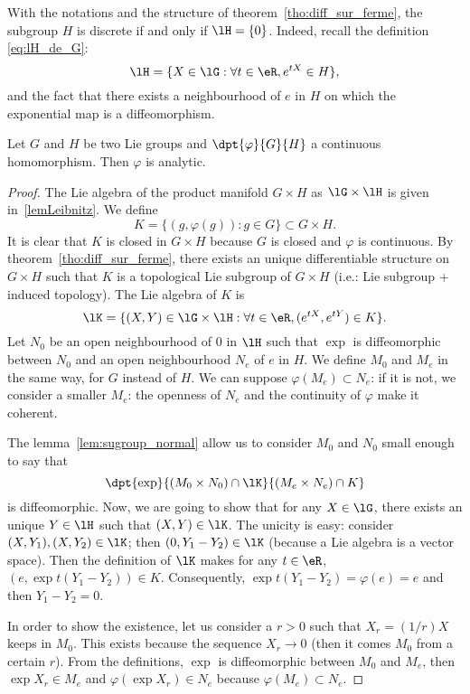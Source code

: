 With the notations and the structure of theorem~\ref{tho:diff_sur_ferme}, the subgroup $H$ is discrete if and only if $\lH=\{0\}$. Indeed, recall the definition \eqref{eq:lH_de_G}:
\[
  \lH=\{X\in\lG: \forall t\in\eR, e^{tX}\in H\},
\]
and the fact that there exists a neighbourhood of $e$ in $H$ on which the exponential map is a diffeomorphism.

\begin{theorem}
Let $G$ and $H$ be two Lie groups and $\dpt{\varphi}{G}{H}$ a continuous homomorphism. Then $\varphi$ is analytic.
\end{theorem}

\begin{proof}
The Lie algebra of the product manifold $G\times H$ as $\lG\times\lH$ is given in~\ref{lemLeibnitz}. We define
\begin{equation}
  K=\{(g,\varphi(g)):g\in G\}\subset G\times H.
\end{equation}
It is clear that $K$ is closed in $G\times H$ because $G$ is closed and $\varphi$ is continuous.
By theorem~\ref{tho:diff_sur_ferme}, there exists an unique differentiable structure on $G\times H$ such that $K$ is a topological Lie subgroup of $G\times H$ (i.e.: Lie subgroup + induced topology). The Lie algebra of $K$ is
\begin{equation}
  \lK=\{(X,Y)\in\lG\times\lH:\forall t\in\eR, (e^{tX},e^{tY})\in K\}.
\end{equation}
Let $N_0$ be an open neighbourhood of $0$ in $\lH$ such that $\exp$ is diffeomorphic between $N_0$ and an open neighbourhood $N_e$ of $e$ in $H$. We define $M_0$ and $M_e$ in the same way, for $G$ instead of $H$. We can suppose $\varphi(M_e)\subset N_e$: if it is not, we consider a smaller $M_e$: the openness of $N_e$ and the continuity of $\varphi$ make it coherent.

The lemma~\ref{lem:sugroup_normal} allow us to consider $M_0$ and $N_0$ small enough to say that
\[
   \dpt{\exp}{(M_0\times N_0)\cap\lK}{(M_e\times N_e)\cap K}
\]
is diffeomorphic. Now, we are going to show that for any $X\in\lG$, there exists an unique $Y\in\lH$ such that $(X,Y)\in\lK$. The unicity is easy: consider $(X,Y_1),(X,Y_2)\in\lK$; then $(0,Y_1-Y_2)\in\lK$ (because a Lie algebra is a vector space). Then the definition of $\lK$ makes for any $t\in\eR$, $(e,\exp{t(Y_1-Y_2)})\in K$. Consequently, $\exp t(Y_1-Y_2)=\varphi(e)=e$ and then $Y_1-Y_2=0$.

In order to show the existence, let us consider a $r>0$ such that $X_r=(1/r)X$ keeps in $M_0$. This exists because the sequence $X_r\to 0$ (then it comes $M_0$ from a certain $r$). From the definitions, $\exp$ is diffeomorphic between $M_0$ and $M_e$, then $\exp X_r\in M_e$ and $\varphi(\exp X_r)\in N_e$ because $\varphi(M_e)\subset N_e$.


\end{proof}
